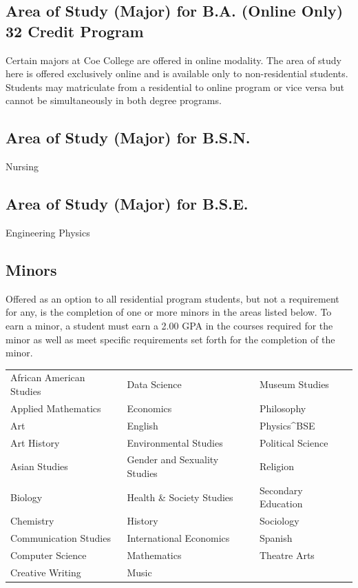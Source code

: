\documentclass[
  letterpaper,
]{scrbook}
\renewcommand\toprule[2]\relax
\renewcommand\bottomrule[2]\relax
\newcounter{none}
\begin{document}
\subsection{Area of Study (Major) for B.A. (Online Only) 32 Credit
Program}\label{area-of-study-major-for-b.a.-online-only-32-credit-program}

Certain majors at Coe College are offered in online modality. The area
of study here is offered exclusively online and is available only to
non-residential students. Students may matriculate from a residential to
online program or vice versa but cannot be simultaneously in both degree
programs.

\subsection{Area of Study (Major) for
B.S.N.}\label{area-of-study-major-for-b.s.n.}

Nursing

\subsection{Area of Study (Major) for
B.S.E.}\label{area-of-study-major-for-b.s.e.}

Engineering Physics

\subsection{Minors}\label{minors}

Offered as an option to all residential program students, but not a
requirement for any, is the completion of one or more minors in the
areas listed below. To earn a minor, a student must earn a 2.00 GPA in
the courses required for the minor as well as meet specific requirements
set forth for the completion of the minor.

{\def\LTcaptype{none} %
\begin{longtable}[]{@{}
  >{\raggedright\arraybackslash}p{}
  >{\raggedright\arraybackslash}p{}
  >{\raggedright\arraybackslash}p{}@{}}
\toprule\noalign{}
\endhead
\bottomrule\noalign{}
\endlastfoot
African American Studies & Data Science & Museum Studies \\
Applied Mathematics & Economics & Philosophy \\
Art & English & Physics\^{}BSE \\
Art History & Environmental Studies & Political Science \\
Asian Studies & Gender and Sexuality Studies & Religion \\
Biology & Health \& Society Studies & Secondary Education \\
Chemistry & History & Sociology \\
Communication Studies & International Economics & Spanish \\
Computer Science & Mathematics & Theatre Arts \\
Creative Writing & Music & \\
\end{longtable}
}
\end{document}

